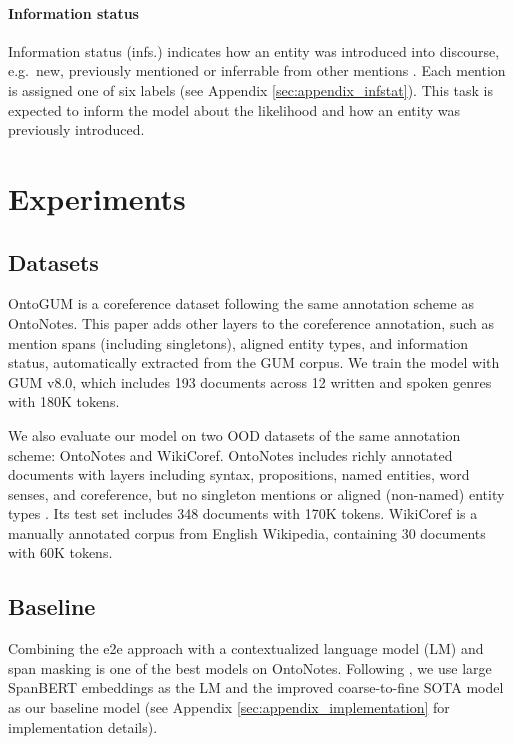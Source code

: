 \documentclass[11pt]{article}
\begin{document}
\vspace{-0.2em}
\paragraph{Information status} Information status (infs.) indicates how an entity was introduced into discourse, e.g.~new, previously mentioned or inferrable from other mentions \citep{Prince_Taxonomy81}. Each mention is assigned one of six labels (see Appendix \ref{sec:appendix_infstat}).
This task is expected to inform the model about the likelihood and how an entity was previously introduced.

\section{Experiments} \label{sec:experiments}

\subsection{Datasets}
OntoGUM \citep{zhu-etal-2021-ontogum} is a coreference dataset following the same annotation scheme as OntoNotes.  This paper adds other layers to the coreference annotation, such as mention spans (including singletons), aligned entity types, and information status,  automatically extracted from the GUM corpus. We train the model with GUM v8.0, which includes 193 documents across 12 written and spoken genres with 180K tokens. 


We also evaluate our model on two OOD datasets of the same annotation scheme: OntoNotes and WikiCoref. OntoNotes includes richly annotated documents with layers including syntax, propositions, named entities, word senses, and coreference, but no singleton mentions or aligned (non-named) entity types \citep{pradhan-etal-2013-towards}. Its test set includes 348 documents with 170K tokens. WikiCoref \citep{ghaddar-langlais-2016-wikicoref} is a manually annotated corpus from English Wikipedia, containing 30 documents with 60K tokens. 




\subsection{Baseline}
Combining the e2e approach with a contextualized language model (LM) and span masking is one of the best models on OntoNotes. Following \citet{joshi-etal-2020-spanbert}, we use large SpanBERT embeddings as the LM and the improved coarse-to-fine \citep{lee-etal-2018-higher} SOTA model as our baseline model (see Appendix \ref{sec:appendix_implementation} for implementation details).
\end{document}
